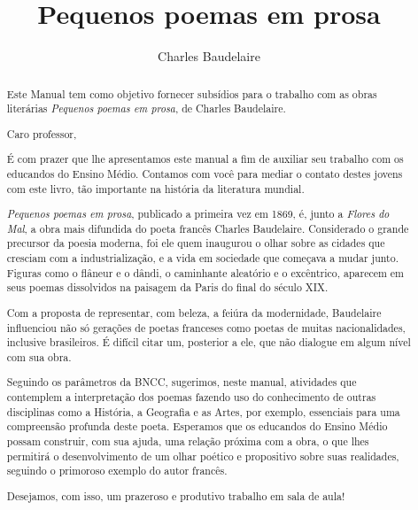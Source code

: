 \documentclass[12pt]{extarticle}
\begin{document}
\newcommand{\AutorLivro}{Charles Baudelaire}
\newcommand{\TituloLivro}{Pequenos poemas em prosa}
\newcommand{\Tema}{Ficção, mistério e fantasia}
\newcommand{\Genero}{Poema}
\newcommand{\imagemCapa}{./images/PNLD0010-01.png}
\newcommand{\issnppub}{---}
\newcommand{\issnepub}{---}
\newcommand{\colaborador}{\textbf{Bruno Gradella e Vicente Castro} é uma pessoa incrível e vai fazer um bom serviço.}


\title{\TituloLivro}
\author{\AutorLivro}
\def\authornotes{\colaborador}

\date{}
\maketitle


\begin{abstract}
Este Manual tem como objetivo fornecer subsídios para o trabalho com as
obras literárias \emph{Pequenos poemas em prosa}, de Charles Baudelaire.

Caro professor,

É com prazer que lhe apresentamos este manual a fim de auxiliar seu 
trabalho com os educandos do Ensino Médio. Contamos com você para 
mediar o contato destes jovens com este livro, tão importante na 
história da literatura mundial. 

\emph{Pequenos poemas em prosa}, publicado a primeira vez em 1869, 
é, junto a \emph{Flores do Mal}, a obra mais difundida do poeta 
francês Charles Baudelaire. 
Considerado o grande precursor da poesia moderna, foi ele quem inaugurou 
o olhar sobre as cidades que cresciam com a industrialização, e a vida 
em sociedade que começava a mudar junto. Figuras como o flâneur e o dândi, 
o caminhante aleatório e o excêntrico, aparecem em seus poemas dissolvidos 
na paisagem da Paris do final do século XIX. 

Com a proposta de representar, com beleza, a feiúra da modernidade, 
Baudelaire influenciou não só gerações de poetas franceses como poetas de 
muitas nacionalidades, inclusive brasileiros. É difícil citar um, posterior 
a ele, que não dialogue em algum nível com sua obra. 

Seguindo os parâmetros da BNCC, sugerimos, neste manual, atividades que 
contemplem a interpretação dos poemas fazendo uso do conhecimento de outras 
disciplinas como a História, a Geografia e as Artes, por exemplo, essenciais 
para uma compreensão profunda deste poeta. Esperamos que os educandos do 
Ensino Médio possam construir, com sua ajuda, uma relação próxima com a obra, 
o que lhes permitirá o desenvolvimento de um olhar poético e propositivo sobre 
suas realidades, seguindo o primoroso exemplo do autor francês.

Desejamos, com isso, um prazeroso e produtivo trabalho em sala de aula!


\end{abstract}
\end{document}
